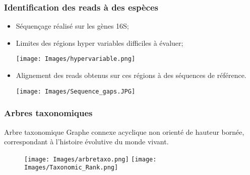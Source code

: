\documentclass{beamer}
\begin{document}
\begin{frame}
\frametitle{Identification des reads à des espèces}

\begin{itemize}
\item Séquençage réalisé sur les gènes 16S;
\pause
\bigskip
\item Limites des \alert{régions hyper variables} difficiles à évaluer;

\begin{center}
\texttt{[image: Images/hypervariable.png]}
\end{center}

\pause
\item \alert{Alignement} des reads obtenus sur ces régions à des séquences de référence.

\begin{center}
\texttt{[image: Images/Sequence\_gaps.JPG]}
\end{center}

\end{itemize}

\end{frame}

\begin{frame}
\frametitle{Arbres taxonomiques}

\begin{block}{Arbre taxonomique} Graphe connexe acyclique non orienté de hauteur bornée, correspondant à l'histoire évolutive du monde vivant.
\end{block}


\begin{figure}
\subfigure\texttt{[image: Images/arbretaxo.png]}
\subfigure\texttt{[image: Images/Taxonomic\_Rank.png]}
\end{figure}


\end{frame}
\end{document}
